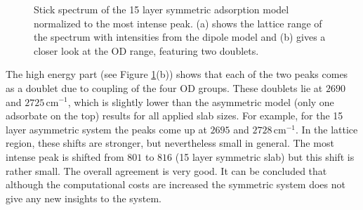 \documentclass[11pt,DIV=13,BCOR=5mm,a4paper,headinclude]{scrbook}
\begin{document}
 \begin{figure}[!h]
    \centering
             \quad
             \caption{Stick spectrum of the 15 layer symmetric adsorption model normalized to the most intense peak.
(a) shows the lattice range of the spectrum with intensities from the dipole model and (b) gives a closer look at the OD range, featuring two doublets.}
            \label{abb:symm-iCa2_spec}
     \end{figure}
The high energy part (see Figure \ref{abb:symm-iCa2_spec}(b)) shows that each of the two peaks comes as a doublet due to coupling of the four OD groups. %
These doublets lie at $2690$ and $2725\,$cm$^{-1}$, which is slightly lower than the asymmetric model (only one adsorbate on the top) results for all applied slab sizes.
For example, for the 15 layer asymmetric system the peaks come up at $2695$ and $2728\,$cm$^{-1}$.
In the lattice region, these shifts are stronger, but nevertheless small in general.
The most intense peak is shifted from $801$ to $816$ (15 layer symmetric slab) but this shift is rather small.
The overall agreement is very good.
It can be concluded that although the computational costs are increased the symmetric system does not give any new insights to the system.
\\
\end{document}

